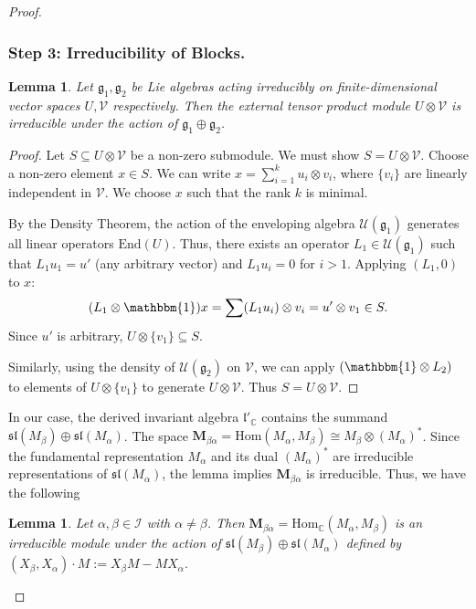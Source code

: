 \documentclass[10pt,twocolumn,superscriptaddress,aps,amsmath,amssymb,citeautoscript,floatfix,prx]{revtex4-2}
\newcounter{alg}
\theoremstyle{plain}
\theoremstyle{plain}
\theoremstyle{plain}
\theoremstyle{plain}
\theoremstyle{plain}
\theoremstyle{plain}
\newcommand{\C}{\mathbb{C}}
\newcommand{\End}{\mathrm{End}}
\newcommand{\Hom}{\mathrm{Hom}}
\newcommand{\I}{\mathbbm{1}}
\theoremstyle{plain}
\newtheorem{smlemma}[smtheorem]{Lemma}
\theoremstyle{definition}
\theoremstyle{plain}
\begin{document}
\begin{appendix}
\begin{proof}
\subsubsection*{Step 3: Irreducibility of Blocks.}

\begin{smlemma}
    Let $\mathfrak{g}_1, \mathfrak{g}_2$ be Lie algebras acting irreducibly on finite-dimensional vector spaces $U, \mathcal{V}$ respectively. 
    Then the external tensor product module $U \otimes \mathcal{V}$ is irreducible under the action of $\mathfrak{g}_1 \oplus \mathfrak{g}_2$.
\end{smlemma}

\begin{proof}
    Let $S \subseteq U \otimes \mathcal{V}$ be a non-zero submodule. We must show $S = U \otimes \mathcal{V}$.
    Choose a non-zero element $x \in S$. We can write $x = \sum_{i=1}^k u_i \otimes v_i$, where $\{v_i\}$ are linearly independent in $\mathcal{V}$. We choose $x$ such that the rank $k$ is minimal.
    
    By the Density Theorem, the action of the enveloping algebra $\mathcal{U}(\mathfrak{g}_1)$ generates all linear operators $\End(U)$. 
    Thus, there exists an operator $L_1 \in \mathcal{U}(\mathfrak{g}_1)$ such that $L_1 u_1 = u'$ (any arbitrary vector) and $L_1 u_i = 0$ for $i > 1$.
    Applying $(L_1, 0)$ to $x$:
    \[ (L_1 \otimes \I) x = \sum (L_1 u_i) \otimes v_i = u' \otimes v_1 \in S. \]
    Since $u'$ is arbitrary, $U \otimes \{v_1\} \subseteq S$.
    
    Similarly, using the density of $\mathcal{U}(\mathfrak{g}_2)$ on $\mathcal{V}$, we can apply $(\I \otimes L_2)$ to elements of $U \otimes \{v_1\}$ to generate $U \otimes \mathcal{V}$. Thus $S = U \otimes \mathcal{V}$.
\end{proof}

In our case, the derived invariant algebra $\mathfrak{l}'_\C$ contains the summand $\mathfrak{sl}(M_{\beta}) \oplus \mathfrak{sl}(M_{\alpha})$. 
The space $\mathbf{M}_{\beta\alpha} = \Hom(M_{\alpha}, M_{\beta}) \cong M_{\beta} \otimes (M_{\alpha})^*$.
Since the fundamental representation $M_{\alpha}$ and its dual $(M_{\alpha})^*$ are irreducible representations of $\mathfrak{sl}(M_{\alpha})$, 
the lemma implies $\mathbf{M}_{\beta\alpha}$ is irreducible.
Thus, we have the following

\begin{smlemma}\label{lem:irreducibility}
Let $\alpha,\beta\in\mathcal I$ with $\alpha\neq \beta$. Then
$
\mathbf M_{\beta\alpha}=\Hom_\C(M_\alpha,M_\beta)
$
is an irreducible module under the action of
$
\mathfrak{sl}\left(M_\beta\right) \oplus \mathfrak{sl}\left(M_\alpha\right)
$
defined by
$
(X_\beta,X_\alpha)\cdot M := X_\beta M - M X_\alpha .
$
\end{smlemma}


\end{proof}
\end{appendix}
\end{document}
